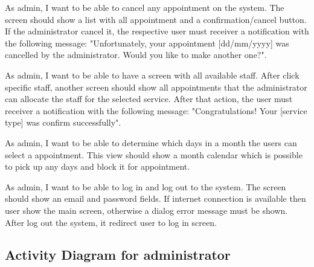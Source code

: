 \begin{description}[font=$\bullet$~\normalfont\scshape\color{red!50!black}]

\item [Cancel appointment] As admin, I want to be able to cancel any appointment on the system. The screen should show a list with all appointment and a confirmation/cancel button. If the administrator cancel it, the respective user must receiver a notification with the following message: "Unfortunately, your appointment [dd/mm/yyyy] was cancelled by the administrator. Would you like to make another one?".

\item [Allocate staff for a service]As admin, I want to be able to have a screen with all available staff. After click specific staff, another screen should show all appointments that the administrator can allocate the staff for the selected service.  After that action, the user must receiver a notification with the following message: "Congratulations! Your [service type] was confirm successfully".

\item [Workday]As admin, I want to be able to determine which days in a month the users can select a appointment. This view should show a month calendar which is possible to pick up any days and block it for appointment. 

\item [Log in] As admin, I want to be able to log in and log out to the system. The screen should  show an email and password fields. If internet connection is available then user show the main screen, otherwise a dialog error message must be shown. After log out the system, it redirect user to log in screen.

\end{description}
\newpage
\subsection{Activity Diagram for administrator}

